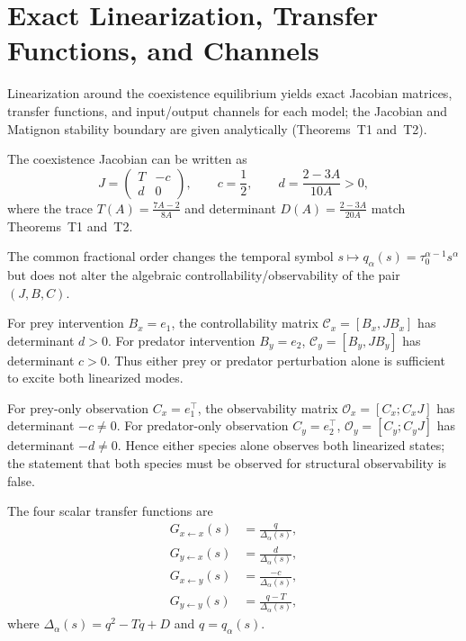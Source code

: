 \section{Exact Linearization, Transfer Functions, and Channels}
\label{sec:linearization}

Linearization around the coexistence equilibrium yields exact Jacobian matrices, transfer functions, and input/output channels for each model; the Jacobian and Matignon stability boundary are given analytically (Theorems~T1 and~T2).

The coexistence Jacobian can be written as
\begin{equation}
J = \begin{pmatrix} T & -c \\ d & 0 \end{pmatrix},
\qquad c = \frac{1}{2},
\qquad d = \frac{2-3A}{10A} > 0,
\label{eq:jacform}
\end{equation}
where the trace \(T(A) = \frac{7A-2}{8A}\) and determinant \(D(A) = \frac{2-3A}{20A}\) match Theorems~T1 and~T2.

The common fractional order changes the temporal symbol \(s \mapsto q_\alpha(s) = \tau_0^{\alpha-1} s^\alpha\) but does not alter the algebraic controllability/observability of the pair \((J,B,C)\).

For prey intervention \(B_x = e_1\), the controllability matrix \(\mathcal{C}_x = [B_x, J B_x]\) has determinant \(d>0\).
For predator intervention \(B_y = e_2\), \(\mathcal{C}_y = [B_y, J B_y]\) has determinant \(c>0\).
Thus either prey or predator perturbation alone is sufficient to excite both linearized modes.

For prey-only observation \(C_x = e_1^\top\), the observability matrix \(\mathcal{O}_x = [C_x; C_x J]\) has determinant \(-c \neq 0\).
For predator-only observation \(C_y = e_2^\top\), \(\mathcal{O}_y = [C_y; C_y J]\) has determinant \(-d \neq 0\).
Hence either species alone observes both linearized states; the statement that both species must be observed for structural observability is false.

The four scalar transfer functions are
\begin{align}
G_{x\leftarrow x}(s) &= \frac{q}{\Delta_\alpha(s)}, \\
G_{y\leftarrow x}(s) &= \frac{d}{\Delta_\alpha(s)}, \\
G_{x\leftarrow y}(s) &= \frac{-c}{\Delta_\alpha(s)}, \\
G_{y\leftarrow y}(s) &= \frac{q - T}{\Delta_\alpha(s)},
\end{align}
where \(\Delta_\alpha(s) = q^2 - T q + D\) and \(q = q_\alpha(s)\).

